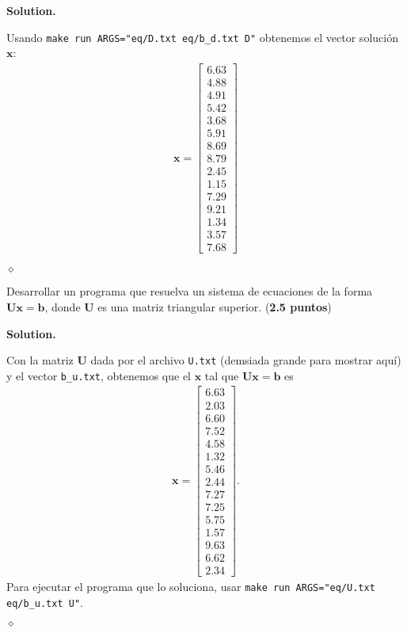 \documentclass{article}
\theoremstyle{problemstyle}
\newenvironment{solution}{%
  \begin{mdframed}[linewidth=0.8pt,linecolor=Gray,backgroundcolor=Gray!5,roundcorner=5pt]%
  \noindent\textbf{Solution.}%
}{%
\hfill $ \diamond $ 
  \end{mdframed}%
}
\begin{document}
\begin{solution}
	Usando \texttt{make run ARGS="eq/D.txt eq/b\_d.txt D"} obtenemos el vector soluci\'on $ \mathbf{x} $:
	\begin{align*}
		\mathbf{x} = \begin{bmatrix}
			             6.63 \\ 4.88 \\ 4.91 \\ 5.42 \\ 3.68 \\ 5.91 \\ 8.69 \\ 8.79 \\ 2.45 \\ 1.15 \\ 7.29 \\ 9.21 \\ 1.34 \\ 3.57 \\ 7.68
		             \end{bmatrix}
	\end{align*}

\end{solution}

\begin{problem}
Desarrollar un programa que resuelva un sistema de ecuaciones de la forma $\mathbf{Ux} = \mathbf{b}$, donde $ \mathbf{U} $ es una matriz triangular superior. (\textbf{2.5 puntos})
\end{problem}
\begin{solution}
	Con la matriz $ \mathbf{U} $ dada por el archivo \texttt{U.txt} (demsiada grande para mostrar aqu\'i) y el vector \texttt{b\_u.txt}, obtenemos que el $ \mathbf{x} $ tal que $ \mathbf{Ux} = \mathbf{b} $ es
	\begin{align*}
		\mathbf{x} =
		\begin{bmatrix}
			6.63 \\ 2.03 \\ 6.60 \\ 7.52 \\ 4.58 \\ 1.32 \\ 5.46 \\ 2.44 \\ 7.27 \\ 7.25 \\ 5.75 \\ 1.57 \\ 9.63 \\ 6.62 \\ 2.34
		\end{bmatrix}.
	\end{align*}
	Para ejecutar el programa que lo soluciona, usar \texttt{make run ARGS="eq/U.txt eq/b\_u.txt U"}.

\end{solution}
\end{document}
